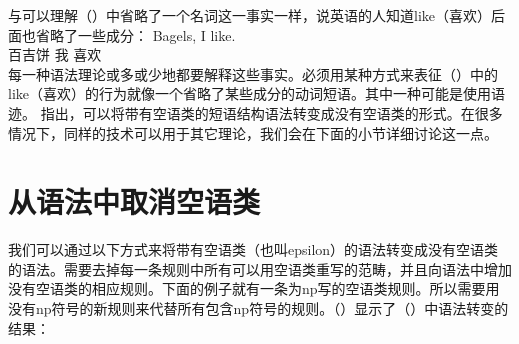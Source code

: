 与可以理解（）中省略了一个名词这一事实一样，说英语的人知道like（喜欢）后面也省略了一些成分：
\ea
\gll Bagels, I like.\\
	 百吉饼 我 喜欢\\
\z
每一种语法理论或多或少地都要解释这些事实。必须用某种方式来表征（）中的like（喜欢）的行为就像一个省略了某些成分的动词短语。其中一种可能是使用语迹。 \citet*[, \S~4.1]{BHPS61a}指出，可以将带有空语类的短语结构语法转变成没有空语类的形式。在很多情况下，同样的技术可以用于其它理论，我们会在下面的小节详细讨论这一点。

\section{从语法中取消空语类}
\label{Abschnitt-Eleminierung-leerer-Elemente}

我们可以通过以下方式来将带有空语类（也叫epsilon）的语法转变成没有空语类的语法。需要去掉每一条规则中所有可以用空语类重写的范畴，并且向语法中增加没有空语类的相应规则。下面的例子就有一条为np写的空语类规则。所以需要用没有np符号的新规则来代替所有包含np符号的规则。（）显示了（）中语法转变的结果：

